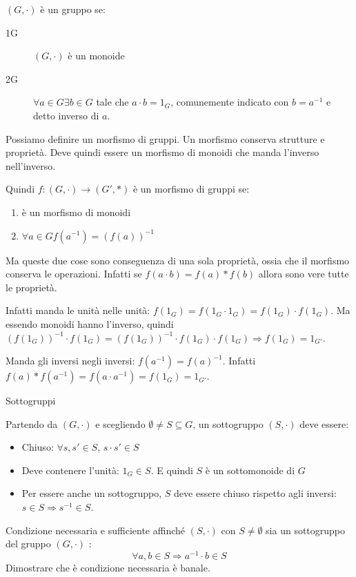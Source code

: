 $(G, \cdot)$ \`e un gruppo se:
\begin{description}
    \item[1G] $(G, \cdot)$ \`e un monoide
    \item[2G] $\forall a \in G \exists b \in G $ tale che $a \cdot b = 1_G$, comunemente indicato con $b = a^{-1}$ e detto inverso di $a$.
\end{description}

Possiamo definire un morfismo di gruppi. Un morfismo conserva strutture e propriet\`a. Deve quindi essere un morfismo di monoidi che manda l'inverso nell'inverso.

Quindi $f : (G, \cdot) \to (G', \ast)$ \`e un morfismo di gruppi se:
\begin{enumerate}
    \item \`e un morfismo di monoidi
    \item $\forall a \in G f(a^{-1}) = (f(a))^{-1}$
\end{enumerate}
Ma queste due cose sono conseguenza di una sola propriet\`a, ossia che il morfismo conserva le operazioni. Infatti se $f(a \cdot b) = f(a) \ast f(b)$ allora sono vere tutte le propriet\`a.

Infatti manda le unit\`a nelle unit\`a: $f(1_G) = f(1_G \cdot 1_G) = f(1_G) \cdot f(1_G)$. Ma essendo monoidi hanno l'inverso, quindi $(f(1_G))^{-1} \cdot f(1_G) = (f(1_G))^{-1} \cdot f(1_G) \cdot f(1_G) \Rightarrow f(1_G) = 1_{G'}$.

Manda gli inversi negli inversi: $f(a^{-1}) = f(a)^{-1}$. Infatti $f(a) \ast f(a^{-1}) = f(a \cdot a^{-1}) = f(1_G) = 1_{G'}$.

Sottogruppi

Partendo da $(G, \cdot)$ e scegliendo $\emptyset \neq S \subseteq G$, un sottogruppo $(S, \cdot)$ deve essere:
\begin{itemize}
    \item Chiuso: $\forall s, s' \in S$, $s \cdot s' \in S$
    \item Deve contenere l'unit\`a: $1_G \in S$. E quindi $S$ \`e un sottomonoide di $G$
    \item Per essere anche un sottogruppo, $S$ deve essere chiuso rispetto agli inversi: $s \in S \Rightarrow s^{-1} \in S$.
\end{itemize}
Condizione necessaria e sufficiente affinch\'e $(S, \cdot)$ con $S \neq \emptyset$ sia un sottogruppo del gruppo $(G, \cdot)$ :
\[
\forall a, b \in S \Rightarrow a^{-1} \cdot  b \in S
\]
Dimostrare che \`e condizione necessaria \`e banale. 

